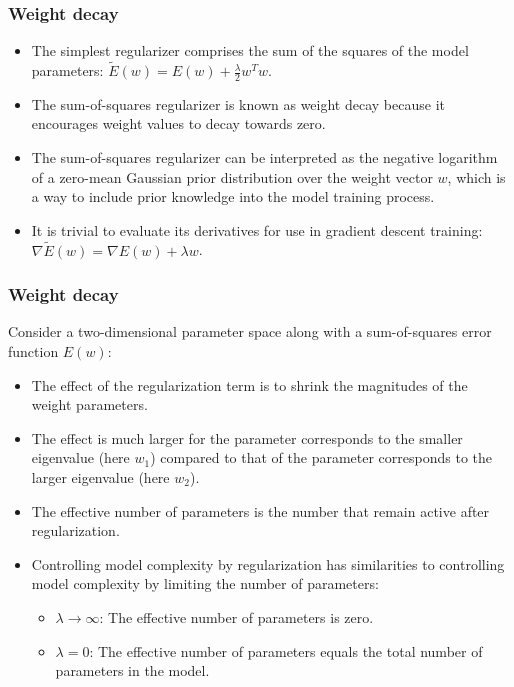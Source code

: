 \documentclass{beamer}
\begin{document}
\begin{frame}
    \frametitle{Weight decay}
    \begin{itemize}
        \item The simplest regularizer comprises the sum of the squares of the model parameters: $\tilde{E}(w)=E(w)+\frac{\lambda}{2}w^{T}w$.
        \item The sum-of-squares regularizer is known as weight decay because it encourages weight values to decay towards zero.
        \item The sum-of-squares regularizer can be interpreted as the negative logarithm of a zero-mean Gaussian prior distribution over the weight vector $w$, which is a way to include prior knowledge into the model training process.
        \item It is trivial to evaluate its derivatives for use in gradient descent training: $\nabla\tilde{E}(w)=\nabla{}E(w)+\lambda{}w$.
    \end{itemize}
\end{frame}

\begin{frame}
    \frametitle{Weight decay}
    Consider a two-dimensional parameter space along with a sum-of-squares error function $E(w)$:
    \begin{itemize}
        \item The effect of the regularization term is to shrink the magnitudes of the weight parameters.
        \item The effect is much larger for the parameter corresponds to the smaller eigenvalue (here $w_{1}$) compared to that of the parameter corresponds to the larger eigenvalue (here $w_{2}$).
        \item The effective number of parameters is the number that remain active after regularization.
        \item Controlling model complexity by regularization has similarities to controlling model complexity by limiting the number of parameters:
        \begin{itemize}
            \item $\lambda\to\infty$: The effective number of parameters is zero.
            \item $\lambda=0$: The effective number of parameters equals the total number of parameters in the model.
        \end{itemize}
    \end{itemize}
\end{frame}
\end{document}
